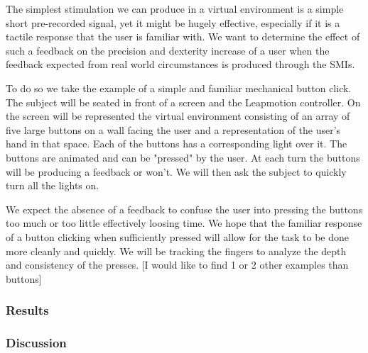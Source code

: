 \documentclass[10pt,journal,compsoc]{IEEEtran}
\begin{document}
The simplest stimulation we can produce in a virtual environment is a simple short pre-recorded signal, yet it might be hugely effective, especially if it is a tactile response that the user is familiar with.
We want to determine the effect of such a feedback on the precision and dexterity increase of a user when the feedback expected from real world circumstances is produced through the SMIs.

To do so we take the example of a simple and familiar mechanical button click. The subject will be seated in front of a screen and the Leapmotion controller. On the screen will be represented the virtual environment consisting of an array of five large buttons on a wall facing the user and a representation of the user's hand in that space. Each of the buttons has a corresponding light over it. The buttons are animated and can be "pressed" by the user. At each turn the buttons will be producing a feedback or won't. We will then ask the subject to quickly turn all the lights on.

We expect the absence of a feedback to confuse the user into pressing the buttons too much or too little effectively loosing time. We hope that the familiar response of a button clicking when sufficiently pressed will allow for the task to be done more cleanly and quickly. We will be tracking the fingers to analyze the depth and consistency of the presses.
[I would like to find 1 or 2 other examples than buttons]


\subsubsection{Results}
		
\subsubsection{Discussion}

%
\end{document}
